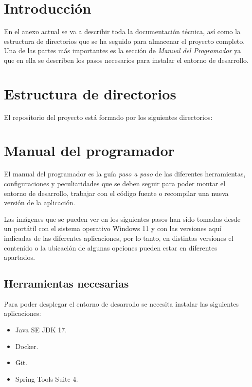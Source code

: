 
\section{Introducción}

En el anexo actual se va a describir toda la documentación técnica, así como la estructura de directorios que se ha seguido para almacenar el proyecto completo.
Una de las partes más importantes es la sección de \textit{Manual del Programador} ya que en ella se describen los pasos necesarios para instalar el entorno de desarrollo. 

\section{Estructura de directorios}

El repositorio del proyecto está formado por los siguientes directorios:

\section{Manual del programador}

El manual del programador es la guía \textit{paso a paso} de las diferentes herramientas, configuraciones y peculiaridades que se deben seguir para poder montar el entorno de desarrollo, trabajar con el código fuente o recompilar una nueva versión de la aplicación.

Las imágenes que se pueden ver en los siguientes pasos han sido tomadas desde un portátil con el sistema operativo Windows 11 y con las versiones aquí indicadas de las diferentes aplicaciones, por lo tanto, en distintas versiones el contenido o la ubicación de algunas opciones pueden estar en diferentes apartados.

\subsection{Herramientas necesarias}

Para poder desplegar el entorno de desarrollo se necesita instalar las siguientes aplicaciones:

\begin{itemize}
	\item Java SE JDK 17.
	\item Docker.
	\item Git.
	\item Spring Tools Suite 4.
\end{itemize}

